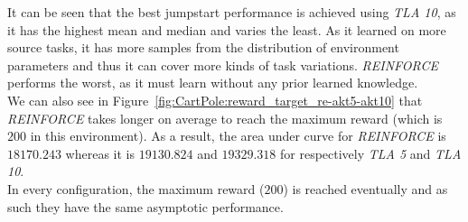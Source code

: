 It can be seen that the best jumpstart performance is achieved using \textit{TLA 10}, as it has the highest mean and median and varies the least. As it learned on more source tasks, it has more samples from the distribution of environment parameters and thus it can cover more kinds of task variations. \textit{REINFORCE} performs the worst, as it must learn without any prior learned knowledge.\\

We can also see in Figure~\ref{fig:CartPole:reward_target_re-akt5-akt10} that \textit{REINFORCE} takes longer on average to reach the maximum reward (which is $200$ in this environment). As a result, the area under curve for \textit{REINFORCE} is $18170.243$ whereas it is $19130.824$ and $19329.318$ for respectively \textit{TLA 5} and \textit{TLA 10}.\\
In every configuration, the maximum reward ($200$) is reached eventually and as such they have the same asymptotic performance.\\

